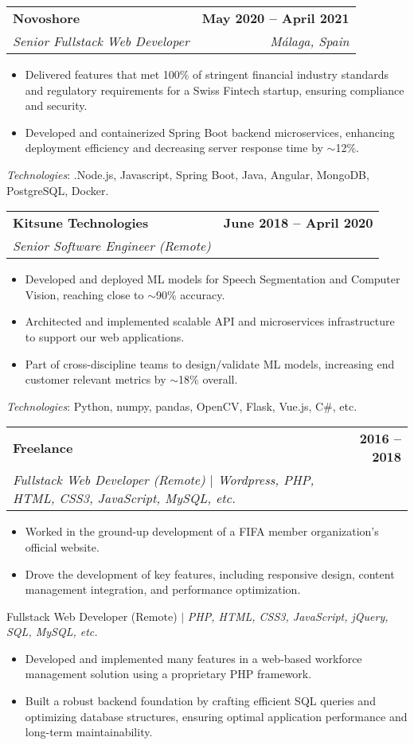 \documentclass[letterpaper,11pt]{article}
\makeatletter
\newcommand{\resumeItem}[1]{
  \item\small{
    {#1 \vspace{-2pt}}
  }
}
\newcommand{\resumeSubheading}[4]{
  \vspace{-2pt}\item
    \begin{tabular*}{1.0\textwidth}[t]{l@{\extracolsep{\fill}}r}
      \textbf{#1} & \textbf{\small #2} \\
      \textit{\small#3} & \textit{\small #4} \\
    \end{tabular*}\vspace{-7pt}
}
\newcommand{\resumeItemListStart}{\begin{itemize}}
\newcommand{\resumeItemListEnd}{\end{itemize}\vspace{-5pt}}
\makeatother
\begin{document}
    \resumeSubheading
      {Novoshore}{May 2020 -- April 2021}
      {Senior Fullstack Web Developer}{Málaga, Spain}
      \resumeItemListStart
        \resumeItem{Delivered features that met 100\% of stringent financial industry standards and regulatory requirements for a Swiss Fintech startup, ensuring compliance and security.}
        \resumeItem{Developed and containerized Spring Boot backend microservices, enhancing deployment efficiency and decreasing server response time by $\sim$12\%.}
    \resumeItemListEnd
    \begin{itemize}[leftmargin=0.0in, label={}]
      \small{
        \item{
          \emph{Technologies}{: .Node.js, Javascript, Spring Boot, Java, Angular, MongoDB, PostgreSQL, Docker.} \\
        }
      }
    \end{itemize}

    \resumeSubheading
      {Kitsune Technologies}{June 2018 -- April 2020}
      {Senior Software Engineer (Remote)}{}
      \resumeItemListStart
        \resumeItem{Developed and deployed ML models for Speech Segmentation and Computer Vision, reaching close to $\sim$90\% accuracy.}
        \resumeItem{Architected and implemented scalable API and microservices infrastructure to support our web applications.}
        \resumeItem{Part of cross-discipline teams to design/validate ML models, increasing end customer relevant metrics by $\sim$18\% overall.}
      \resumeItemListEnd
    \begin{itemize}[leftmargin=0.0in, label={}]
      \small{
        \item{
          \emph{Technologies}{: Python, numpy, pandas, OpenCV, Flask, Vue.js, C\#, etc.} \\
        }
      }
    \end{itemize}

    \resumeSubheading
      {Freelance}{2016 -- 2018}
      {Fullstack Web Developer (Remote) $|$ \emph{Wordpress, PHP, HTML, CSS3, JavaScript, MySQL, etc.}}{}
      \resumeItemListStart
        \resumeItem{Worked in the ground-up development of a FIFA member organization's official website.}
        \resumeItem{Drove the development of key features, including responsive design, content management integration, and performance optimization.}
      \resumeItemListEnd

      {Fullstack Web Developer (Remote) $|$ \emph{PHP, HTML, CSS3, JavaScript, jQuery, SQL, MySQL, etc.}}{}
      \vspace{-8pt}
      \resumeItemListStart
        \resumeItem{Developed and implemented many features in a web-based workforce management solution using a proprietary PHP framework.}
        \resumeItem{Built a robust backend foundation by crafting efficient SQL queries and optimizing database structures, ensuring optimal application performance and long-term maintainability.}
      \resumeItemListEnd
\end{document}
